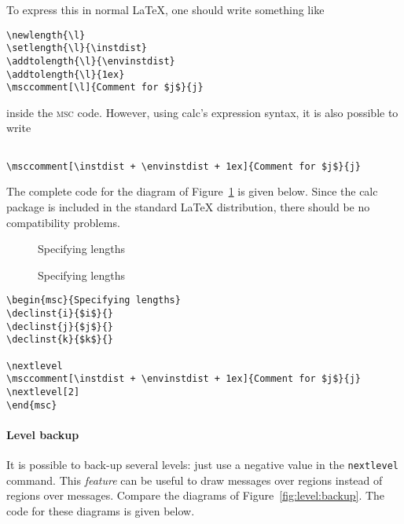 \documentclass[a4paper]{article}
\newcommand{\cmd}[1]{\texttt{\bslash #1}}
\newcommand{\acro}[1]{{\scshape\lowercase{#1}}}
\newcommand\MSC{\acro{MSC}}
\begin{document}
To express this in normal \LaTeX, one should write something like
\begin{verbatim}
\newlength{\l}
\setlength{\l}{\instdist}
\addtolength{\l}{\envinstdist}
\addtolength{\l}{1ex}
\msccomment[\l]{Comment for $j$}{j}
\end{verbatim}
inside the \MSC{} code. However, using \textsf{calc}'s expression
syntax, it is also possible to write
\begin{verbatim}

\msccomment[\instdist + \envinstdist + 1ex]{Comment for $j$}{j}
\end{verbatim}
The complete code for the diagram of
Figure~\ref{fig:specifying:lengths} is given below.  Since the
\textsf{calc} package is included in the standard \LaTeX{}
distribution, there should be no compatibility problems.
\begin{figure}[htb]
\begin{center}
\begin{msc}{Specifying lengths}

\nextlevel
{}
\nextlevel[2]
\end{msc}

\caption{Specifying lengths}
\label{fig:specifying:lengths}
\end{center}
\end{figure}

{\small
\begin{verbatim}
\begin{msc}{Specifying lengths}
\declinst{i}{$i$}{}
\declinst{j}{$j$}{}
\declinst{k}{$k$}{}

\nextlevel
\msccomment[\instdist + \envinstdist + 1ex]{Comment for $j$}{j}
\nextlevel[2]
\end{msc}
\end{verbatim}
}

\paragraph{Level backup}
It is possible to back-up several levels: just use a negative value in
the \cmd{nextlevel} command. This \emph{feature} can be useful to draw
messages over regions instead of regions over messages. Compare the
diagrams of Figure~\ref{fig:level:backup}. The code for these diagrams
is given below.
\end{document}
